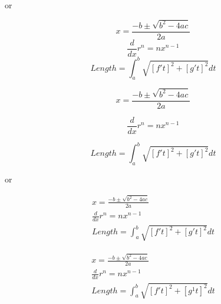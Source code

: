 \documentclass[]{article}
\begin{document}
or

\begin{fleqn}
	\begin{equation}\label{eq1}
		x=\frac{-b\pm\sqrt{b^2-4ac}}{2a}
	\end{equation}
	\begin{equation}\label{eq2}
		\frac{d}{dx}r^n=nx^{n-1}
	\end{equation}
	\begin{equation}\label{eq3}
		Length=\int_{a}^{b}\sqrt{[f't]^2+[g't]^2}dt
	\end{equation}
\end{fleqn}

\newpage


\lipsum[11]

\begin{equation}\label{eq1}
	x=\frac{-b\pm\sqrt{b^2-4ac}}{2a}
\end{equation}

\begin{equation}\label{eq2}
	\frac{d}{dx}r^n=nx^{n-1}
\end{equation}

\begin{equation}\label{eq3}
	Length=\int_{a}^{b}\sqrt{[f't]^2+[g't]^2}dt
\end{equation}

or     

\begin{gather}
	x=\frac{-b\pm\sqrt{b^2-4ac}}{2a}            \label{eq1} \\
	\frac{d}{dx}r^n=nx^{n-1}                    \label{eq2} \\
	Length=\int_{a}^{b}\sqrt{[f't]^2+[g't]^2}dt \label{eq3}
\end{gather}

\lipsum[11]

\newpage


\begin{fleqn}[2em]    
	
	\begin{gather}
		x=\frac{-b\pm\sqrt{b^2-4ac}}{2a}            \label{eq1} \\
		\frac{d}{dx}r^n=nx^{n-1}                    \label{eq2} \\
		Length=\int_{a}^{b}\sqrt{[f't]^2+[g^1t]^2}dt \label{eq3}
	\end{gather}
	
\end{fleqn}

\newpage


\lipsum[11]
\end{document}
